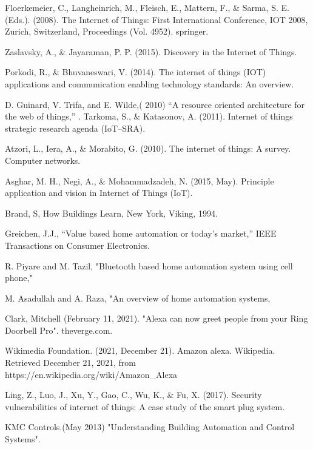 \documentclass[conference]{IEEEtran}
\begin{document}
\begin{thebibliography}{00}
	

	
Floerkemeier, C., Langheinrich, M., Fleisch, E., Mattern, F., \& Sarma, S. E. (Eds.). (2008). The Internet of Things: First International Conference, IOT 2008, Zurich, Switzerland, Proceedings (Vol. 4952). springer.

Zaslavsky, A., \& Jayaraman, P. P. (2015). Discovery in the Internet of Things. 
 
 Porkodi, R., \& Bhuvaneswari, V. (2014). The internet of things (IOT) applications and communication enabling technology standards: An overview. 
 
 D. Guinard, V. Trifa, and E. Wilde,( 2010) “A resource oriented architecture for the web of things,”
.
 Tarkoma, S., \& Katasonov, A. (2011). Internet of things strategic research agenda (IoT–SRA). 
 
 Atzori, L., Iera, A., \& Morabito, G. (2010). The internet of things: A survey. Computer networks.
 
 Asghar, M. H., Negi, A., \& Mohammadzadeh, N. (2015, May). Principle application and vision in Internet of Things (IoT). 
 
 Brand, S, How Buildings Learn, New York, Viking, 1994. 
 
 Greichen, J.J., “Value based home automation or today's market,” IEEE Transactions on Consumer Electronics.
 
 R. Piyare and M. Tazil, "Bluetooth based home automation system using cell phone," 

 M. Asadullah and A. Raza, "An overview of home automation systems,

 Clark, Mitchell (February 11, 2021). "Alexa can now greet people from your Ring Doorbell Pro". theverge.com. 

 Wikimedia Foundation. (2021, December 21). Amazon alexa. Wikipedia. Retrieved December 21, 2021, from https://en.wikipedia.org/wiki/Amazon\_Alexa 

Ling, Z., Luo, J., Xu, Y., Gao, C., Wu, K., \& Fu, X. (2017). Security vulnerabilities of internet of things: A case study of the smart plug system.

KMC Controls.(May 2013) "Understanding Building Automation and Control Systems". 


\end{thebibliography}
\end{document}
